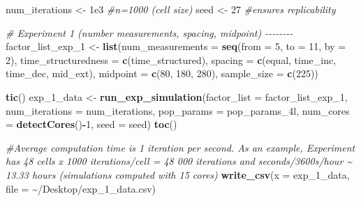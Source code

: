 \documentclass[
12pt, %
twoside,
english]{guelphthesis}
\newenvironment{Shaded}{\begin{snugshade}}{\end{snugshade}}
\newcommand{\AttributeTok}[1]{\textcolor[rgb]{0.13,0.29,0.53}{#1}}
\newcommand{\CommentTok}[1]{\textcolor[rgb]{0.56,0.35,0.01}{\textit{#1}}}
\newcommand{\DecValTok}[1]{\textcolor[rgb]{0.00,0.00,0.81}{#1}}
\newcommand{\FloatTok}[1]{\textcolor[rgb]{0.00,0.00,0.81}{#1}}
\newcommand{\FunctionTok}[1]{\textcolor[rgb]{0.13,0.29,0.53}{\textbf{#1}}}
\newcommand{\NormalTok}[1]{#1}
\newcommand{\OtherTok}[1]{\textcolor[rgb]{0.56,0.35,0.01}{#1}}
\newcommand{\SpecialCharTok}[1]{\textcolor[rgb]{0.81,0.36,0.00}{\textbf{#1}}}
\newcommand{\StringTok}[1]{\textcolor[rgb]{0.31,0.60,0.02}{#1}}
\begin{document}
\begin{Shaded}
\begin{Highlighting}[numbers=left,,]
\NormalTok{num\_iterations }\OtherTok{\textless{}{-}} \FloatTok{1e3} \CommentTok{\#n=1000 (cell size)}
\NormalTok{seed }\OtherTok{\textless{}{-}} \DecValTok{27} \CommentTok{\#ensures replicability }

\CommentTok{\# Experiment 1 (number measurements,  spacing, midpoint) {-}{-}{-}{-}{-}{-}{-}{-}}
\NormalTok{factor\_list\_exp\_1 }\OtherTok{\textless{}{-}} \FunctionTok{list}\NormalTok{(}\StringTok{\textquotesingle{}num\_measurements\textquotesingle{}} \OtherTok{=} \FunctionTok{seq}\NormalTok{(}\AttributeTok{from =} \DecValTok{5}\NormalTok{, }\AttributeTok{to =} \DecValTok{11}\NormalTok{, }\AttributeTok{by =} \DecValTok{2}\NormalTok{), }
                          \StringTok{\textquotesingle{}time\_structuredness\textquotesingle{}} \OtherTok{=} \FunctionTok{c}\NormalTok{(}\StringTok{\textquotesingle{}time\_structured\textquotesingle{}}\NormalTok{),}
                          \StringTok{\textquotesingle{}spacing\textquotesingle{}} \OtherTok{=} \FunctionTok{c}\NormalTok{(}\StringTok{\textquotesingle{}equal\textquotesingle{}}\NormalTok{, }\StringTok{\textquotesingle{}time\_inc\textquotesingle{}}\NormalTok{, }\StringTok{\textquotesingle{}time\_dec\textquotesingle{}}\NormalTok{, }\StringTok{\textquotesingle{}mid\_ext\textquotesingle{}}\NormalTok{), }
                          \StringTok{\textquotesingle{}midpoint\textquotesingle{}} \OtherTok{=} \FunctionTok{c}\NormalTok{(}\DecValTok{80}\NormalTok{, }\DecValTok{180}\NormalTok{, }\DecValTok{280}\NormalTok{),  }
                          \StringTok{\textquotesingle{}sample\_size\textquotesingle{}} \OtherTok{=} \FunctionTok{c}\NormalTok{(}\DecValTok{225}\NormalTok{))}

\FunctionTok{tic}\NormalTok{()}
\NormalTok{exp\_1\_data }\OtherTok{\textless{}{-}} \FunctionTok{run\_exp\_simulation}\NormalTok{(}\AttributeTok{factor\_list =}\NormalTok{ factor\_list\_exp\_1, }\AttributeTok{num\_iterations =}\NormalTok{ num\_iterations, }\AttributeTok{pop\_params =}\NormalTok{ pop\_params\_4l, }
                                 \AttributeTok{num\_cores =} \FunctionTok{detectCores}\NormalTok{()}\SpecialCharTok{{-}}\DecValTok{1}\NormalTok{, }\AttributeTok{seed =}\NormalTok{ seed)}
\FunctionTok{toc}\NormalTok{()}

\CommentTok{\#Average computation time is 1 iteration per second. As an example, Experiment has 48 cells x 1000 iterations/cell = 48 000 iterations and seconds/3600s/hour \textasciitilde{} 13.33 hours (simulations computed with 15 cores)}
\FunctionTok{write\_csv}\NormalTok{(}\AttributeTok{x =}\NormalTok{ exp\_1\_data, }\AttributeTok{file =} \StringTok{\textquotesingle{}\textasciitilde{}/Desktop/exp\_1\_data.csv\textquotesingle{}}\NormalTok{)}


\end{Highlighting}
\end{Shaded}
\end{document}
